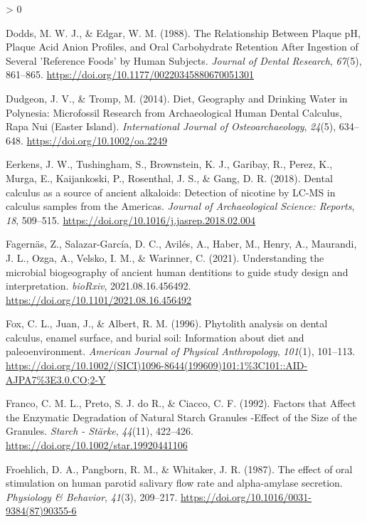 \documentclass[
]{article}
\newlength{\cslhangindent}
\newenvironment{CSLReferences}[2] %
 {%
  \setlength{\parindent}{0pt}
  \ifodd #1 \everypar{\setlength{\hangindent}{\cslhangindent}}\ignorespaces\fi
  \ifnum #2 > 0
  \setlength{\parskip}{#2\baselineskip}
  \fi
 }%
 {}
\begin{document}
\begin{CSLReferences}{1}{0}
\leavevmode\hypertarget{ref-doddsCarbohydrateRetention1988}{}%
Dodds, M. W. J., \& Edgar, W. M. (1988). The {Relationship Between Plaque pH}, {Plaque Acid Anion Profiles}, and {Oral Carbohydrate Retention After Ingestion} of {Several} '{Reference Foods}' by {Human Subjects}. \emph{Journal of Dental Research}, \emph{67}(5), 861--865. \url{https://doi.org/10.1177/00220345880670051301}

\leavevmode\hypertarget{ref-dudgeonDietGeographyDrinking2014}{}%
Dudgeon, J. V., \& Tromp, M. (2014). Diet, {Geography} and {Drinking Water} in {Polynesia}: Microfossil {Research} from {Archaeological Human Dental Calculus}, {Rapa Nui} ({Easter Island}). \emph{International Journal of Osteoarchaeology}, \emph{24}(5), 634--648. \url{https://doi.org/10.1002/oa.2249}

\leavevmode\hypertarget{ref-eerkensDentalCalculusSource2018}{}%
Eerkens, J. W., Tushingham, S., Brownstein, K. J., Garibay, R., Perez, K., Murga, E., Kaijankoski, P., Rosenthal, J. S., \& Gang, D. R. (2018). Dental calculus as a source of ancient alkaloids: Detection of nicotine by {LC}-{MS} in calculus samples from the {Americas}. \emph{Journal of Archaeological Science: Reports}, \emph{18}, 509--515. \url{https://doi.org/10.1016/j.jasrep.2018.02.004}

\leavevmode\hypertarget{ref-fagernasMicrobialBiogeography2021}{}%
Fagernäs, Z., Salazar-García, D. C., Avilés, A., Haber, M., Henry, A., Maurandi, J. L., Ozga, A., Velsko, I. M., \& Warinner, C. (2021). Understanding the microbial biogeography of ancient human dentitions to guide study design and interpretation. \emph{bioRxiv}, 2021.08.16.456492. \url{https://doi.org/10.1101/2021.08.16.456492}

\leavevmode\hypertarget{ref-foxPhytolithCalculus1996}{}%
Fox, C. L., Juan, J., \& Albert, R. M. (1996). Phytolith analysis on dental calculus, enamel surface, and burial soil: Information about diet and paleoenvironment. \emph{American Journal of Physical Anthropology}, \emph{101}(1), 101--113. \url{https://doi.org/10.1002/(SICI)1096-8644(199609)101:1\%3C101::AID-AJPA7\%3E3.0.CO;2-Y}

\leavevmode\hypertarget{ref-francoStarchDegradation1992}{}%
Franco, C. M. L., Preto, S. J. do R., \& Ciacco, C. F. (1992). Factors that {Affect} the {Enzymatic Degradation} of {Natural Starch Granules} -{Effect} of the {Size} of the {Granules}. \emph{Starch - Stärke}, \emph{44}(11), 422--426. \url{https://doi.org/10.1002/star.19920441106}

\leavevmode\hypertarget{ref-froehlichEffectOral1987}{}%
Froehlich, D. A., Pangborn, R. M., \& Whitaker, J. R. (1987). The effect of oral stimulation on human parotid salivary flow rate and alpha-amylase secretion. \emph{Physiology \& Behavior}, \emph{41}(3), 209--217. \url{https://doi.org/10.1016/0031-9384(87)90355-6}


\end{CSLReferences}
\end{document}
